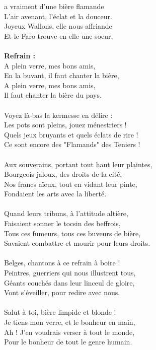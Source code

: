 %
 a vraiment d'une bière flamande
\\L'air avenant, l'éclat et la douceur.
\\Joyeux Wallons, elle nous affriande
\\Et le Faro trouve en elle une soeur.
\\\\\textbf{Refrain :}
\\A plein verre, mes bons amis,
\\En la buvant, il faut chanter la bière,
\\A plein verre, mes bons amis,
\\Il faut chanter la bière du pays.
\\\\Voyez là-bas la kermesse en délire :
\\Les pots sont pleins, jouez ménestriers !
\\Quels jeux bruyants et quels éclats de rire !
\\Ce sont encore des "Flamands" des Teniers !
\\\\Aux souverains, portant tout haut leur plaintes,
\\Bourgeois jaloux, des droits de la cité,
\\Nos francs aïeux, tout en vidant leur pinte,
\\Fondaient les arts avec la liberté.
\\\\Quand leurs tribuns, à l'attitude altière,
\\Faisaient sonner le tocsin des beffrois,
\\Tous ces fumeurs, tous ces buveurs de bière,
\\Savaient combattre et mourir pour leurs droits.
\\\\Belges, chantons à ce refrain à boire !
\\Peintres, guerriers qui nous illustrent tous,
\\Géants couchés dans leur linceul de gloire,
\\Vont s'éveiller, pour redire avec nous.
\\\\Salut à toi, bière limpide et blonde !
\\Je tiens mon verre, et le bonheur en main,
\\Ah ! J'en voudrais verser à tout le monde,
\\Pour le bonheur de tout le genre humain.

\breakpage